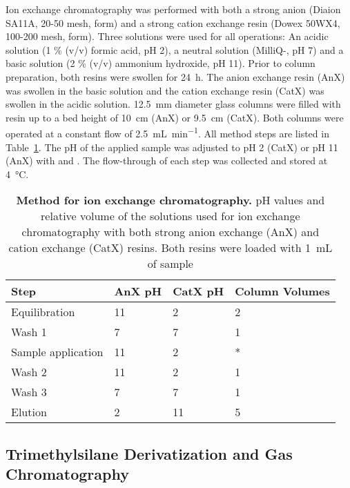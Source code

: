 	Ion exchange chromatography was performed with both a strong anion (Diaion SA11A, 20-50 mesh,  form) and a strong cation exchange resin (Dowex 50WX4, 100-200 mesh,  form). Three solutions were used for all operations: An acidic solution (1 \% (v/v) formic acid, pH 2), a neutral solution (MilliQ-, pH 7) and a basic solution (2 \% (v/v) ammonium hydroxide, pH 11).
	Prior to column preparation, both resins were swollen for \SI{24}{\hour}. The anion exchange resin (AnX) was swollen in the basic solution and the cation exchange resin (CatX) was swollen in the acidic solution. \SI{12.5}{\milli\meter} diameter glass columns were filled with resin up to a bed height of \SI{10}{\centi\meter} (AnX) or \SI{9.5}{\centi\meter} (CatX).
	Both columns were operated at a constant flow of \SI{2.5}{\milli\liter\per\minute}. All method steps are listed in Table~\ref{tab:ion_exchange_tab}. The pH of the applied sample was adjusted to pH 2 (CatX) or pH 11 (AnX) with  and . The flow-through of each step was collected and stored at \SI{4}{\celsius}.

	\begin{table}[htbp]
		\caption[Method for ion exchange chromatography]{\textbf{Method for ion exchange chromatography.} pH values and relative volume of the solutions used for ion exchange chromatography with both strong anion exchange (AnX) and cation exchange (CatX) resins. Both resins were loaded with \SI{1}{\milli\liter} of sample}
		\label{tab:ion_exchange_tab}
		\centering
		\begin{tabularx}{\textwidth}{XXXX}
			\toprule
			\textbf{Step} 			& \textbf{AnX pH}	& \textbf{CatX pH} 	& \textbf{Column Volumes} 	\\
			\midrule
			Equilibration 	 		& 11 				& 2 				& 2		\\
			Wash 1 					& 7 				& 7 				& 1 	\\
			Sample application 		& 11 				& 2 				& *		\\
			Wash 2  				& 11 				& 2 				& 1 	\\
			Wash 3 					& 7					& 7 				& 1 	\\
			Elution 				& 2 				& 11 				& 5 	\\
			\bottomrule
		\end{tabularx}
	\end{table}

	\subsection{Trimethylsilane Derivatization and Gas Chromatography} %
	\label{sub:trimethylsilane_derivatization_and_gas_chromatography}

